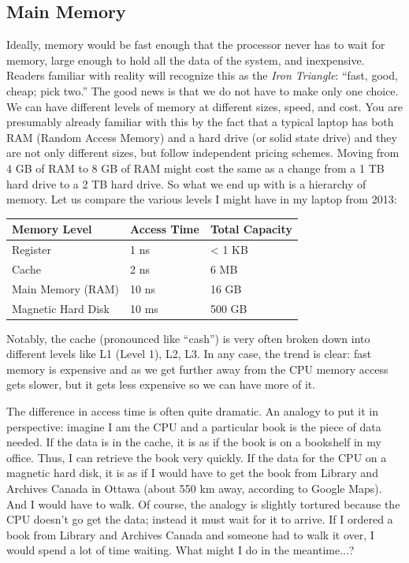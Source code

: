 \subsection*{Main Memory}
Ideally, memory would be fast enough that the processor never has to wait for memory, large enough to hold all the data of the system, and inexpensive. Readers familiar with reality will recognize this as the \textit{Iron Triangle}: ``fast, good, cheap; pick two.'' The good news is that we do not have to make only one choice. We can have different levels of memory at different sizes, speed, and cost. You are presumably already familiar with this by the fact that a typical laptop has both RAM (Random Access Memory) and a hard drive (or solid state drive) and they are not only different sizes, but follow independent pricing schemes. Moving from 4 GB of RAM to 8 GB of RAM might cost the same as a change from a 1 TB hard drive to a 2 TB hard drive. So what we end up with is a hierarchy of memory. Let us compare the various levels I might have in my laptop from 2013:

\begin{center}
	\begin{tabular}{l|l|l}
	\textbf{Memory Level} & \textbf{Access Time} & \textbf{Total Capacity} \\ \hline
	Register & 1 ns & < 1 KB \\
	Cache & 2 ns & 6 MB \\
	Main Memory (RAM) & 10 ns & 16 GB \\
	Magnetic Hard Disk & 10 ms & 500 GB \\
	\end{tabular}
\end{center}

Notably, the cache (pronounced like ``cash'') is very often broken down into different levels like L1 (Level 1), L2, L3. In any case, the trend is clear: fast memory is expensive and as we get further away from the CPU memory access gets slower, but it gets less expensive so we can have more of it. 

The difference in access time is often quite dramatic. An analogy to put it in perspective: imagine I am the CPU and a particular book is the piece of data needed. If the data is in the cache, it is as if the book is on a bookshelf in my office. Thus, I can retrieve the book very quickly. If the data for the CPU on a magnetic hard disk, it is as if I would have to get the book from Library and Archives Canada in Ottawa (about 550 km away, according to Google Maps). And I would have to walk. Of course, the analogy is slightly tortured because the CPU doesn't go get the data; instead it must wait for it to arrive. If I ordered a book from Library and Archives Canada and someone had to walk it over, I would spend a lot of time waiting. What might I do in the meantime...?

